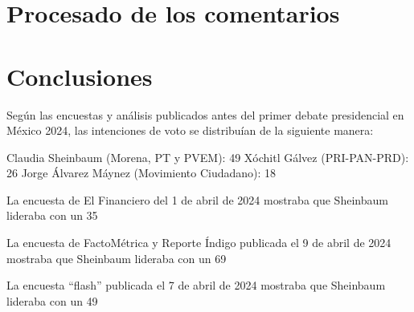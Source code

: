 \chapter{Procesado de los comentarios}





\chapter{Conclusiones}

Según las encuestas y análisis publicados antes del primer debate presidencial en México 2024, las intenciones de voto se distribuían de la siguiente manera:

Claudia Sheinbaum (Morena, PT y PVEM): 49%
Xóchitl Gálvez (PRI-PAN-PRD): 26%
Jorge Álvarez Máynez (Movimiento Ciudadano): 18%


La encuesta de El Financiero del 1 de abril de 2024 mostraba que Sheinbaum lideraba con un 35%

La encuesta de FactoMétrica y Reporte Índigo publicada el 9 de abril de 2024 mostraba que Sheinbaum lideraba con un 69%

La encuesta “flash” publicada el 7 de abril de 2024 mostraba que Sheinbaum lideraba con un 49%